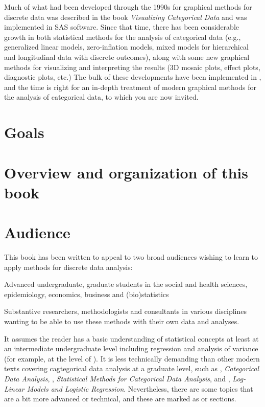 Much of what had been developed through the 1990s for graphical methods for
discrete data was described in the book \emph{Visualizing Categorical Data}
\citep{Friendly:00:VCD} and was implemented in SAS\textsuperscript{\textregistered} software. 
Since that time,  
there has been considerable growth in both statistical methods for the
analysis of categorical data (e.g., generalized linear models, zero-inflation
models, mixed models for hierarchical and longitudinal data with discrete
outcomes), along with some new graphical methods for visualizing and
interpreting the results (3D mosaic plots, effect plots, diagnostic plots, etc.) 
The bulk of these developments have been implemented in \R, and the time is
right for an in-depth treatment of modern graphical methods for the analysis
of categorical data, to which you are now invited.

\section*{Goals}

\section*{Overview and organization of this book}

 
\section*{Audience}
This book has been written to appeal to two broad audiences wishing to learn to apply methods for
discrete data analysis:
 \begin{itemize*}
   \item Advanced undergraduate, graduate students in the social and health sciences, epidemiology,
     economics, business and (bio)statistics
 	\item Substantive researchers, methodologists and consultants in various disciplines wanting to be able to use
 	 these methods with their own data and analyses.
 \end{itemize*}

It assumes the reader has a basic understanding of statistical concepts at least at an
intermediate undergraduate level including regression and analysis of variance
(for example, at the level of \citet{Neter-etal:90,MendenhallSincich:2003}).
It is less technically demanding than other modern texts covering
cagtegorical data analysis at a graduate level, such as
 \citet{Agresti:2013}, \emph{Categorical Data Analysis},
 \citet{PowersXie:2008}, \emph{Statistical Methods for Categorical Data Analysis}, and
 \citet{Christensen:97}, \emph{Log-Linear Models and Logistic Regression}.
Nevertheless, there are some topics that are a bit more advanced or technical, and
these are marked as \hard or \veryhard sections.

